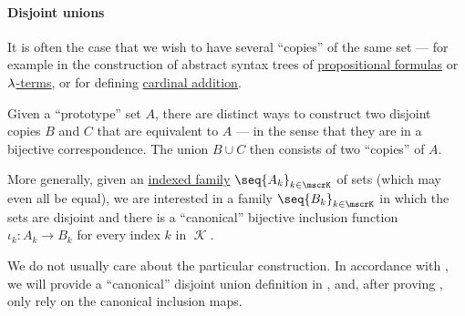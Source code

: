 \paragraph{Disjoint unions}

\begin{remark}\label{rem:disjoint_unions}
  It is often the case that we wish to have several \enquote{copies} of the same set --- for example in the construction of abstract syntax trees of \hyperref[def:propositional_formula_ast]{propositional formulas} or \hyperref[def:lambda_term_ast]{\( \mathrm{\lambda} \)-terms}, or for defining \hyperref[def:cardinal_arithmetic/addition]{cardinal addition}.

  Given a \enquote{prototype} set \( A \), there are distinct ways to construct two disjoint copies \( B \) and \( C \) that are equivalent to \( A \) --- in the sense that they are in a bijective correspondence. The union \( B \cup C \) then consists of two \enquote{copies} of \( A \).

  More generally, given an \hyperref[def:indexed_family]{indexed family} \( \seq{ A_k }_{k \in \mscrK} \) of sets (which may even all be equal), we are interested in a family \( \seq{ B_k }_{k \in \mscrK} \) in which the sets are disjoint and there is a \enquote{canonical} bijective inclusion function \( \iota_k: A_k \to B_k \) for every index \( k \) in \( \mscrK \).

  We do not usually care about the particular construction. In accordance with , we will provide a \enquote{canonical} disjoint union definition in , and, after proving , only rely on the canonical inclusion maps.
\end{remark}

